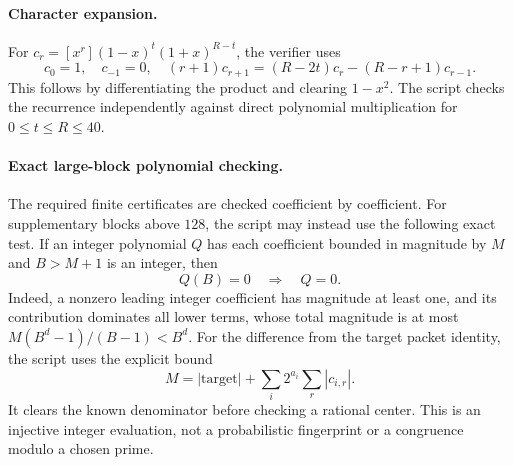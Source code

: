 \documentclass[11pt]{article}
\theoremstyle{definition}
\theoremstyle{remark}
\begin{document}
\paragraph{Character expansion.}
For $c_r=[x^r](1-x)^t(1+x)^{R-t}$, the verifier uses
\[
 c_0=1,\quad c_{-1}=0,\quad
 (r+1)c_{r+1}=(R-2t)c_r-(R-r+1)c_{r-1}.
\]
This follows by differentiating the product and clearing $1-x^2$.
The script checks the recurrence independently against direct polynomial
multiplication for $0\le t\le R\le40$.

\paragraph{Exact large-block polynomial checking.}
The required finite certificates are checked coefficient by coefficient.
For supplementary blocks above $128$, the script may instead use the
following exact test. If an integer polynomial $Q$ has each coefficient
bounded in magnitude by $M$ and $B>M+1$ is an integer, then
\[
 Q(B)=0\quad\Longrightarrow\quad Q=0.
\]
Indeed, a nonzero leading integer coefficient has magnitude at least
one, and its contribution dominates all lower terms, whose total
magnitude is at most $M(B^d-1)/(B-1)<B^d$. For the difference from the
target packet identity, the script uses the explicit bound
\[
 M=|\text{target}|+\sum_i2^{a_i}\sum_r|c_{i,r}|.
\]
It clears the known denominator before checking a rational center.
This is an injective integer evaluation, not a probabilistic fingerprint
or a congruence modulo a chosen prime.
\end{document}
